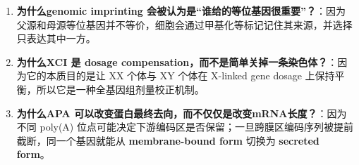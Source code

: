 \documentclass[12pt,fontset=none]{ctexart}
\begin{document}
\begin{enumerate}
\item \textbf{为什么genomic imprinting 会被认为是“谁给的等位基因很重要”？}：因为父源和母源等位基因并不等价，细胞会通过甲基化等标记记住其来源，并选择只表达其中一方。

\item \textbf{为什么XCI 是 dosage compensation，而不是简单关掉一条染色体？}：因为它的本质目的是让 XX 个体与 XY 个体在 X-linked gene dosage 上保持平衡，所以它是一种全基因组剂量校正机制。

\item \textbf{为什么APA 可以改变蛋白最终去向，而不仅仅是改变mRNA长度？}：因为不同 poly(A) 位点可能决定下游编码区是否保留；一旦跨膜区编码序列被提前截断，同一个基因就能从 \textbf{membrane-bound form} 切换为 \textbf{secreted form}。
\end{enumerate}

\end{document}
